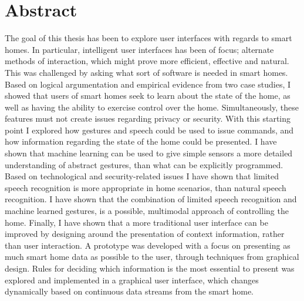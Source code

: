 \section*{Abstract}
The goal of this thesis has been to explore user interfaces with regards to smart homes. In particular, intelligent user interfaces has been of focus; alternate methods of interaction, which might prove more efficient, effective and natural. This was challenged by asking what sort of software is needed in smart homes. Based on logical argumentation and empirical evidence from two case studies, I showed that users of smart homes seek to learn about the state of the home, as well as having the ability to exercise control over the home. Simultaneously, these features must not create issues regarding privacy or security. With this starting point I explored how gestures and speech could be used to issue commands, and how information regarding the state of the home could be presented. 
I have shown that machine learning can be used to give simple sensors a more detailed understanding of abstract gestures, than what can be explicitly programmed. Based on technological and security-related issues I have shown that limited speech recognition is more appropriate in home scenarios, than natural speech recognition. I have shown that the combination of limited speech recognition and machine learned gestures, is a possible, multimodal approach of controlling the home. Finally, I have shown that a more traditional user interface can be improved by designing around the presentation of context information, rather than user interaction. A prototype was developed with a focus on presenting as much smart home data as possible to the user, through techniques from graphical design. Rules for deciding which information is the most essential to present was explored and implemented in a graphical user interface, which changes dynamically based on continuous data streams from the smart home.